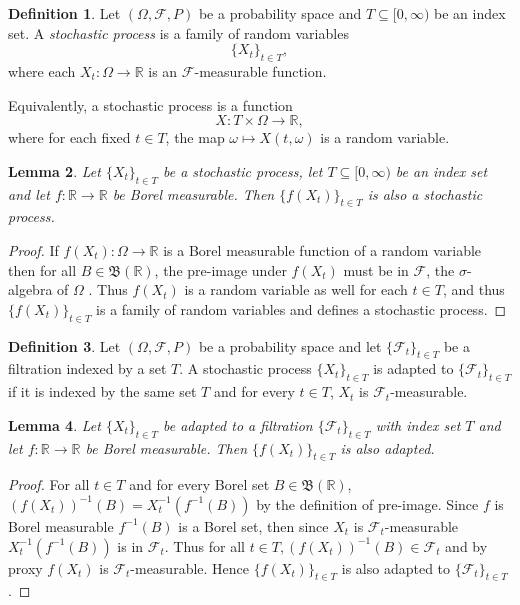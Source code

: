\documentclass[12pt]{article}
\theoremstyle{definition}
\newtheorem{definition}{Definition}[section]
\theoremstyle{plain}
\newtheorem{lemma}[definition]{Lemma}
\theoremstyle{remark}
\begin{document}
\begin{definition}
Let $(\Omega,\mathcal{F},P)$ be a probability space and $T \subseteq [0,\infty)$ be an index set. A \textit{stochastic process} is a family of random variables
\[
\{X_t\}_{t \in T},
\]
where each $X_t : \Omega \to \mathbb{R}$ is an $\mathcal{F}$-measurable function.

Equivalently, a stochastic process is a function
\[
X : T \times \Omega \to \mathbb{R},
\]
where for each fixed $t \in T$, the map $\omega \mapsto X(t,\omega)$ is a random variable.
\end{definition}

\begin{lemma}
Let $\{X_t\}_{t \in T}$ be a stochastic process, let $T \subseteq [0,\infty)$ be an index set and let $f:\mathbb{R} \to \mathbb{R}$ be Borel measurable. Then $\{f(X_t)\}_{t \in T}$ is also a stochastic process.
\end{lemma}

\begin{proof}
If $f(X_t): \Omega \to \mathbb{R}$ is a Borel measurable function of a random variable then for all $B \in \mathfrak{B}(\mathbb{R})$, the pre-image under $f(X_t)$ must be in $\mathcal{F}$, the $\sigma$-algebra of $\Omega$ .  Thus $f(X_t)$ is a random variable as well for each $t \in T$, and thus $
\{f(X_t)\}_{t \in T}$ is a family of random variables and defines a stochastic process.
\end{proof}

\begin{definition}
Let $(\Omega, \mathcal{F},P)$ be a probability space and let $\{\mathcal{F}_t\}_{t \in T}$ be a filtration indexed by a set $T$.  A stochastic process $\{X_t\}_{t \in T}$ is adapted to $\{\mathcal{F}_t\}_{t \in T}$ if it is indexed by the same set $T$ and for every $t \in T$, $X_t$ is $\mathcal{F}_t$-measurable.
\end{definition}

\begin{lemma}
Let $\{X_t\}_{t \in T}$ be adapted to a filtration
$\{\mathcal{F}_t\}_{t \in T}$ with index set $T$ and let
$f:\mathbb{R} \to \mathbb{R}$ be Borel measurable. Then $\{f(X_t)\}_{t \in T}$ is also adapted.
\end{lemma}

\begin{proof}
For all $t \in T$ and for every Borel set $B \in \mathfrak{B}(\mathbb{R})$,  $(f(X_t))^{-1}(B) = X_t^{-1}(f^{-1}(B))$ by the definition of pre-image.  Since $f$ is Borel measurable $f^{-1}(B)$ is a Borel set, then since $X_t$ is $\mathcal{F}_t$-measurable $X_t^{-1}(f^{-1}(B))$ is in $\mathcal{F}_t$.  Thus for all $t \in T, (f(X_t))^{-1}(B) \in \mathcal{F}_t$ and by proxy $f(X_t)$ is $\mathcal{F}_t$-measurable.  Hence $\{f(X_t)\}_{t \in T}$ is also adapted to $\{\mathcal{F}_t\}_{t \in T}$.
\end{proof}
\end{document}
